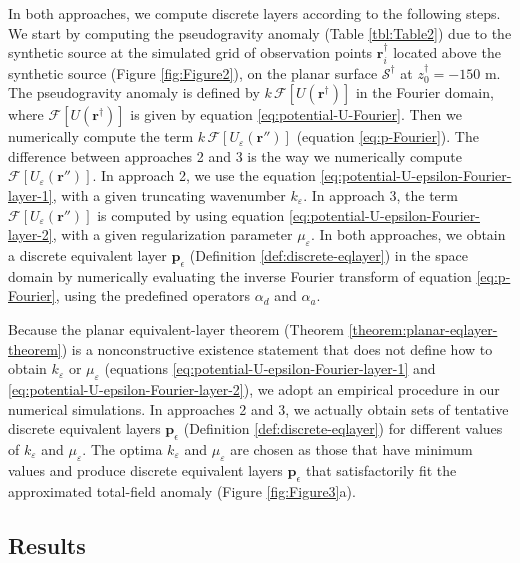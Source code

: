 \documentclass[manuscript,noblind]{geophysics}
\begin{document}
	In both approaches, we compute discrete layers according to the following steps.
	We start by computing the pseudogravity anomaly (Table \ref{tbl:Table2}) due to the synthetic source 
	at the simulated grid of observation points $\mathbf{r}^{\dagger}_{i}$ located above the synthetic source (Figure \ref{fig:Figure2}), 
	on the planar surface $\mathcal{S}^{\dagger}$ at $z^{\dagger}_{0} = -150$ m.
	The pseudogravity anomaly is defined by $k \, \mathcal{F}\left[ U(\mathbf{r}^{\dagger}) \right]$ in the Fourier domain,
	where $\mathcal{F}\left[ U(\mathbf{r}^{\dagger}) \right]$ is given by equation \ref{eq:potential-U-Fourier}.
	Then we numerically compute the term $k \, \mathcal{F}\left[ U_{\varepsilon}(\mathbf{r}'') \right]$ (equation \ref{eq:p-Fourier}).
	The difference between approaches 2 and 3 is the way we numerically compute $\mathcal{F}\left[ U_{\varepsilon}(\mathbf{r}'') \right]$.
	In approach 2, we use the equation 
	\ref{eq:potential-U-epsilon-Fourier-layer-1}, with a given truncating wavenumber $k_{\varepsilon}$. 
	In approach 3, the term $\mathcal{F}\left[ U_{\varepsilon}(\mathbf{r}'') \right]$ is computed by using equation 
	\ref{eq:potential-U-epsilon-Fourier-layer-2}, with a given regularization parameter $\mu_{\varepsilon}$.
	In both approaches, we obtain a discrete equivalent layer $\mathbf{p}_{\epsilon}$ (Definition \ref{def:discrete-eqlayer})
	in the space domain by numerically evaluating the inverse Fourier transform of equation \ref{eq:p-Fourier}, 
	using the predefined operators $\alpha_{d}$ and $\alpha_{a}$.
	
	Because the planar equivalent-layer theorem (Theorem \ref{theorem:planar-eqlayer-theorem}) is a nonconstructive existence statement 
	that does not define how to obtain $k_{\varepsilon}$ or $\mu_{\varepsilon}$ (equations \ref{eq:potential-U-epsilon-Fourier-layer-1} and 
	\ref{eq:potential-U-epsilon-Fourier-layer-2}), we adopt an empirical procedure in our numerical simulations.
	In approaches 2 and 3, we actually obtain sets of tentative discrete equivalent layers $\mathbf{p}_{\epsilon}$ (Definition \ref{def:discrete-eqlayer}) 
	for different values of $k_{\varepsilon}$ and $\mu_{\varepsilon}$. 
	The optima $k_{\varepsilon}$ and $\mu_{\varepsilon}$ are chosen as those that have minimum values 
	and produce discrete equivalent layers $\mathbf{p}_{\epsilon}$ that satisfactorily fit the approximated 
	total-field anomaly (Figure \ref{fig:Figure3}a).
	
	\subsection{Results}
	
\end{document}
